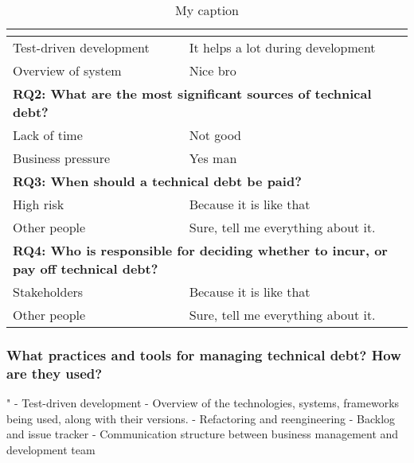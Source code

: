 \begin{table}[]
\centering
\caption{My caption}
\label{tab:answerRQ}
\begin{tabular}{|l|l|}
\hline
\multicolumn{2}{|p{14cm}|}{\cellcolor[HTML]{C0C0C0}{\color[HTML]{000000} \textbf{RQ1: What practices and tools for managing technical debt? How are they used?}}} \\ \hline
Test-driven development                                       & It helps a lot during development                         \\ \hline
Overview of system                        & Nice bro                                                  \\ \hline
\multicolumn{2}{|p{14cm}|}{\cellcolor[HTML]{C0C0C0}\textbf{RQ2: What are the most significant sources of technical debt?}}                      \\ \hline
Lack of time                              & Not good                                                  \\ \hline
Business pressure                         & Yes man                                                   \\ \hline
\multicolumn{2}{|p{14cm}|}{\cellcolor[HTML]{C0C0C0}\textbf{RQ3: When should a technical debt be paid?}}                       \\ \hline
High risk                              & Because it is like that                                   \\ \hline
Other people                              & Sure, tell me everything about it.                        \\ \hline
\multicolumn{2}{|p{14cm}|}{\cellcolor[HTML]{C0C0C0}\textbf{RQ4: Who is responsible for deciding whether to incur, or pay off technical debt?}}                       \\ \hline
Stakeholders                              & Because it is like that                                   \\ \hline
Other people                              & Sure, tell me everything about it.                        \\ \hline
\end{tabular}
\end{table}


\subsubsection{What practices and tools for managing technical debt? How are they used?}"
- Test-driven development
- Overview of the technologies, systems, frameworks being used, along with their versions.
- Refactoring and reengineering
- Backlog and issue tracker
- Communication structure between business management and development team


